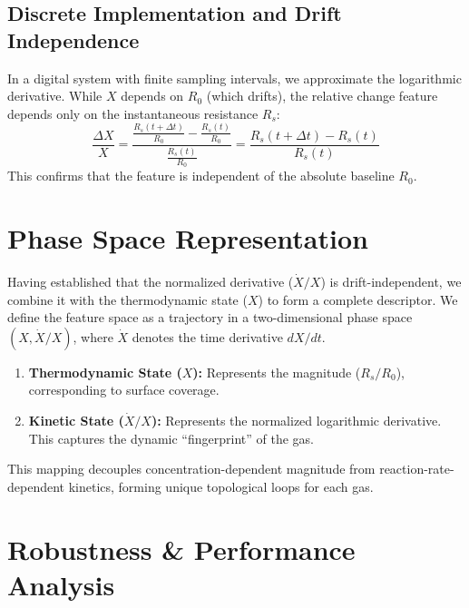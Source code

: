 \documentclass[conference]{IEEEtran}
\begin{document}
\subsection{Discrete Implementation and Drift Independence}
In a digital system with finite sampling intervals, we approximate the logarithmic derivative. While $X$ depends on $R_0$ (which drifts), the relative change feature depends only on the instantaneous resistance $R_s$:
\begin{equation}
\frac{\Delta X}{X} = \frac{\frac{R_s(t+\Delta t)}{R_0} - \frac{R_s(t)}{R_0}}{\frac{R_s(t)}{R_0}} = \frac{R_s(t+\Delta t) - R_s(t)}{R_s(t)}
\end{equation}
This confirms that the feature is independent of the absolute baseline $R_0$.

\section{Phase Space Representation}
Having established that the normalized derivative ($\dot{X}/X$) is drift-independent, we combine it with the thermodynamic state ($X$) to form a complete descriptor. We define the feature space as a trajectory in a two-dimensional phase space $(X, \dot{X}/X)$, where $\dot{X}$ denotes the time derivative $dX/dt$.

\begin{enumerate}
    \item \textbf{Thermodynamic State ($X$):} Represents the magnitude ($R_s/R_0$), corresponding to surface coverage.
    \item \textbf{Kinetic State ($\dot{X}/X$):} Represents the normalized logarithmic derivative. This captures the dynamic ``fingerprint'' of the gas.
\end{enumerate}

This mapping decouples concentration-dependent magnitude from reaction-rate-dependent kinetics, forming unique topological loops for each gas.

\section{Robustness \& Performance Analysis}
\end{document}
